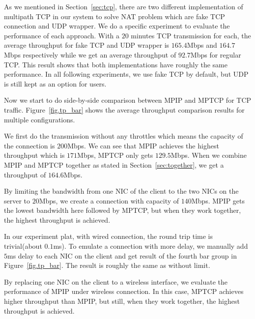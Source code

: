 As we mentioned in Section~\ref{sec:tcp}, there are two different implementation of multipath TCP in our system to solve NAT problem which are fake TCP connection and UDP wrapper. We do a specific experiment to evaluate the performance of each approach. With a $20$ minutes TCP transmission for each, the average throughput for fake TCP and UDP wrapper is $165.4$Mbps and $164.7$Mbps respectively while we get an average throughput of $92.7$Mbps for regular TCP. This result shows that both implementations have roughly the same performance. In all following experiments, we use fake TCP by default, but UDP is still kept as an option for users.


Now we start to do side-by-side comparison between MPIP and MPTCP for TCP traffic. Figure~\ref{fig.tp_bar} shows the average throughput comparison results for multiple configurations.

We first do the transmission without any throttles which means the capacity of the connection is $200$Mbps. We can see that MPIP achieves the highest throughput which is $171$Mbps, MPTCP only gets $129.5$Mbps. When we combine MPIP and MPTCP together as stated in Section~\ref{sec:together}, we get a throughput of $164.6$Mbps.


By limiting the bandwidth from one NIC of the client to the two NICs on the server to $20$Mbps, we create a connection with capacity of $140$Mbps. MPIP gets the lowest bandwidth here followed by MPTCP, but when they work together, the highest throughput is achieved.

In our experiment plat, with wired connection, the round trip time is trivial(about $0.1$ms). To emulate a connection with more delay, we manually add $5$ms delay to each NIC on the client and get result of the fourth bar group in Figure~\ref{fig.tp_bar}. The result is roughly the same as without limit.

By replacing one NIC on the client to a wireless interface, we evaluate the performance of MPIP under wireless connection. In this case, MPTCP achieves higher throughput than MPIP, but still, when they work together, the highest throughput is achieved.

